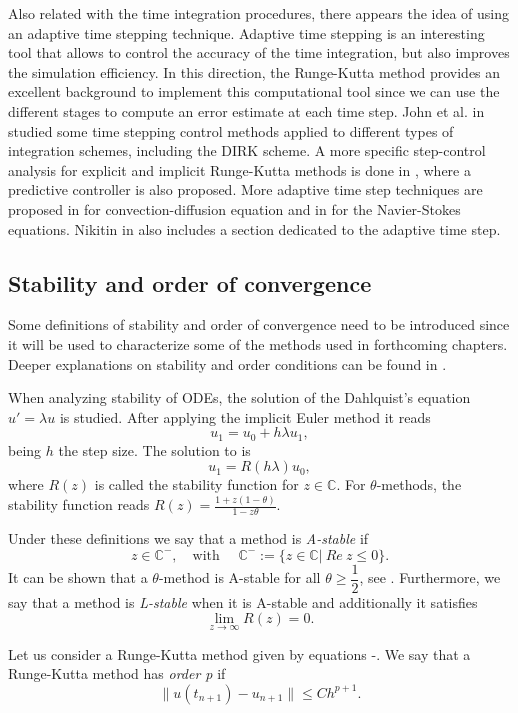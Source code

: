 Also related with the time integration procedures, there appears the idea of using an adaptive time stepping technique. Adaptive time stepping is an interesting tool that allows to control the accuracy of the time integration, but also improves the simulation efficiency. In this direction, the Runge-Kutta method provides an excellent background to implement this computational tool since we can use the different stages to compute an error estimate at each time step. John et al. in \cite{john_adaptive_2010} studied some time stepping control methods applied to different types of integration schemes, including the DIRK scheme. A more specific step-control analysis for explicit and implicit Runge-Kutta methods is done in \cite{hairer_solving_1993}, where a predictive controller is also proposed. More adaptive time step techniques are proposed in \cite{gresho_adaptive_2008} for convection-diffusion equation and in \cite{kay_adaptive_2010} for the Navier-Stokes equations. Nikitin in \cite{nikitin_third-order-accurate_2006} also includes a section dedicated to the adaptive time step.


\subsection{Stability and order of convergence}
Some definitions of stability and order of convergence need to be introduced since it will be used to characterize some of the methods used in forthcoming chapters. Deeper explanations on stability and order conditions can be found in \cite{hairer_solving_2008,hairer_solving_1993}.

When analyzing stability of ODEs, the solution of the Dahlquist's equation $ u'=\lambda u $ is studied. After applying the implicit Euler method it reads
\begin{equation}
\label{eq-C2_Dahlquist}
u_1=u_0+h\lambda u_1,
\end{equation}
being $ h $ the step size. The solution to  is
\begin{equation}
\label{eq-C2_Dahlquist_sol}
u_1=R(h\lambda)u_0,
\end{equation}
where $ R(z) $ is called the stability function for $ z\in\mathbb{C} $. For $ \theta $-methods, the stability function reads $ R(z)=\frac{1+z(1-\theta)}{1-z\theta} $.

Under these definitions we say that a method is \textit{A-stable} if 
\begin{equation}
\label{eq-C2_A_stable}
z\in\mathbb{C}^-,\quad\mbox{with $\quad\mathbb{C^-}:=\{z\in\mathbb{C}|\ Re\ z\le0\} $}.
\end{equation}
It can be shown that a $ \theta $-method is A-stable for all $ \theta\ge\dfrac{1}{2} $, see \cite{lambert_numerical_1991}. Furthermore, we say that a method is \textit{L-stable} when it is A-stable and additionally it satisfies
\begin{equation}
\label{eq-C2_L_stable}
\lim_{z\rightarrow\infty}R(z)=0.
\end{equation}

Let us consider a Runge-Kutta method given by equations -. We say that a Runge-Kutta method has \textit{order p} if 
\begin{equation}
\label{eq-C2_time_RK_order}
\|u(t_{n+1})-u_{n+1}\|\le Ch^{p+1}.
\end{equation}